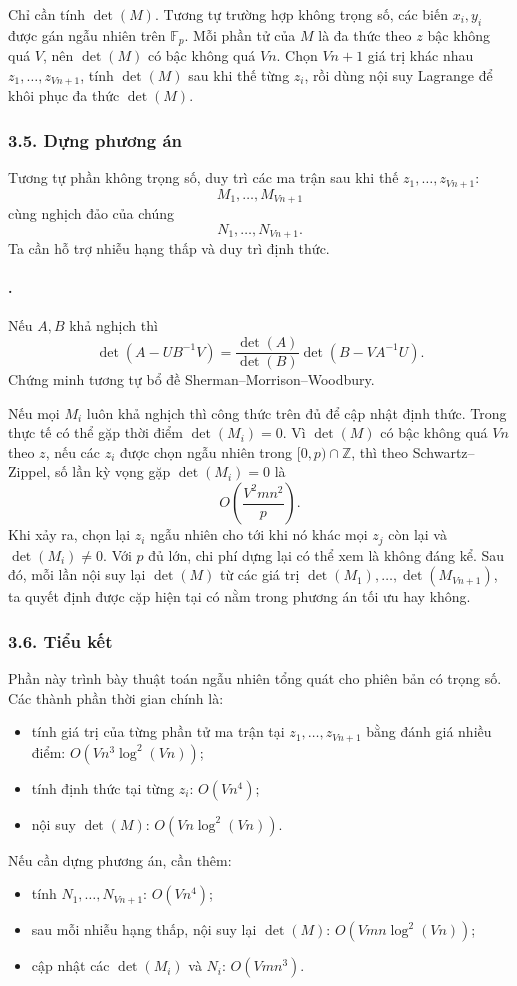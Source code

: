 \documentclass[11pt]{article}
\begin{document}
Chỉ cần tính \(\det(M)\). Tương tự trường hợp không trọng số, các biến
\(x_i,y_i\) được gán ngẫu nhiên trên \(\mathbb F_p\). Mỗi phần tử của \(M\) là
đa thức theo \(z\) bậc không quá \(V\), nên \(\det(M)\) có bậc không quá \(Vn\).
Chọn \(Vn+1\) giá trị khác nhau \(z_1,\ldots,z_{Vn+1}\), tính
\(\det(M)\) sau khi thế từng \(z_i\), rồi dùng nội suy Lagrange để khôi phục đa
thức \(\det(M)\).

\subsubsection*{3.5. Dựng phương án}

Tương tự phần không trọng số, duy trì các ma trận sau khi thế
\(z_1,\ldots,z_{Vn+1}\):
\[
  M_1,\ldots,M_{Vn+1}
\]
cùng nghịch đảo của chúng
\[
  N_1,\ldots,N_{Vn+1}.
\]
Ta cần hỗ trợ nhiễu hạng thấp và duy trì định thức.

\paragraph{.}
Nếu \(A,B\) khả nghịch thì
\[
  \det(A-UB^{-1}V)
  =\frac{\det(A)}{\det(B)}\det(B-VA^{-1}U).
\]
Chứng minh tương tự bổ đề Sherman--Morrison--Woodbury.

Nếu mọi \(M_i\) luôn khả nghịch thì công thức trên đủ để cập nhật định thức.
Trong thực tế có thể gặp thời điểm \(\det(M_i)=0\). Vì \(\det(M)\) có bậc không
quá \(Vn\) theo \(z\), nếu các \(z_i\) được chọn ngẫu nhiên trong
\([0,p)\cap\mathbb Z\), thì theo Schwartz--Zippel, số lần kỳ vọng gặp
\(\det(M_i)=0\) là
\[
  O\left(\frac{V^2mn^2}{p}\right).
\]
Khi xảy ra, chọn lại \(z_i\) ngẫu nhiên cho tới khi nó khác mọi \(z_j\) còn lại
và \(\det(M_i)\ne0\). Với \(p\) đủ lớn, chi phí dựng lại có thể xem là không đáng
kể. Sau đó, mỗi lần nội suy lại \(\det(M)\) từ các giá trị
\(\det(M_1),\ldots,\det(M_{Vn+1})\), ta quyết định được cặp hiện tại có nằm trong
phương án tối ưu hay không.

\subsubsection*{3.6. Tiểu kết}

Phần này trình bày thuật toán ngẫu nhiên tổng quát cho phiên bản có trọng số.
Các thành phần thời gian chính là:
\begin{itemize}
  \item tính giá trị của từng phần tử ma trận tại
  \(z_1,\ldots,z_{Vn+1}\) bằng đánh giá nhiều điểm:
  \(O(Vn^3\log^2(Vn))\);
  \item tính định thức tại từng \(z_i\): \(O(Vn^4)\);
  \item nội suy \(\det(M)\): \(O(Vn\log^2(Vn))\).
\end{itemize}
Nếu cần dựng phương án, cần thêm:
\begin{itemize}
  \item tính \(N_1,\ldots,N_{Vn+1}\): \(O(Vn^4)\);
  \item sau mỗi nhiễu hạng thấp, nội suy lại \(\det(M)\):
  \(O(Vmn\log^2(Vn))\);
  \item cập nhật các \(\det(M_i)\) và \(N_i\): \(O(Vmn^3)\).
\end{itemize}
\end{document}

